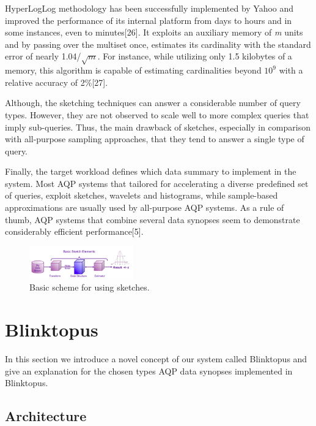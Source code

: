 \documentclass[10pt, conference, compsocconf]{IEEEtran}
\begin{document}
HyperLogLog methodology has been successfully implemented by Yahoo and improved the performance of its internal platform from days to hours and in some instances, even to minutes[26]. It exploits an auxiliary memory of \textit{m} units and by passing over the multiset once, estimates its cardinality with the standard error of nearly 1.04/$\sqrt{\textit{m}}$. For instance, while utilizing only 1.5 kilobytes of a memory, this algorithm is capable of estimating cardinalities beyond $10^9$ with a relative accuracy of 2\%[27].

Although, the sketching techniques can answer a considerable number of query types. However, they are not observed to scale well to more complex queries that imply sub-queries. Thus, the main drawback of sketches, especially in comparison with all-purpose sampling approaches, that they tend to answer a single type of query. 

Finally, the target workload defines which data summary to implement in the system. Most AQP systems that tailored for accelerating a diverse predefined set of queries, exploit sketches, wavelets and histograms, while sample-based approximations are usually used by all-purpose AQP systems. As a rule of thumb, AQP systems that combine several data synopses seem to demonstrate considerably efficient performance[5]. 

\label{fig:sketches}

\begin{figure} \includegraphics[width=0.4\textwidth, center]{img/distinct_count_sketches.png} 
\caption[Basic scheme for using sketches.]%
{Basic scheme for using sketches.\footnotemark}
\end{figure}

\section{Blinktopus}
In this section we introduce a novel concept of our system called Blinktopus and give an explanation for the chosen types AQP data synopses implemented in Blinktopus.  

\subsection{Architecture}
\end{document}
